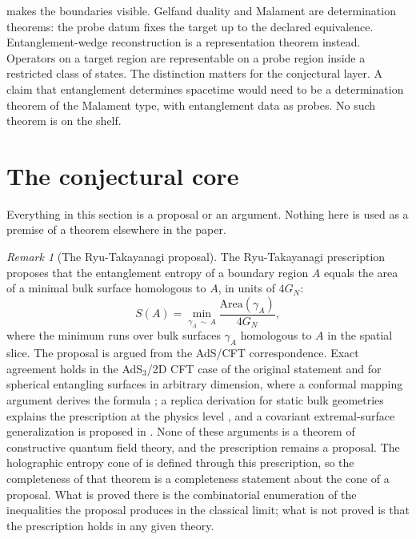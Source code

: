 \documentclass[11pt,letterpaper]{article}
\theoremstyle{definition}
\theoremstyle{remark}
\newtheorem{remark}[theorem]{Remark}
\begin{document}
 makes the boundaries visible. Gelfand duality and Malament are determination theorems: the probe datum fixes the target up to the declared equivalence. Entanglement-wedge reconstruction is a representation theorem instead. Operators on a target region are representable on a probe region inside a restricted class of states. The distinction matters for the conjectural layer. A claim that entanglement determines spacetime would need to be a determination theorem of the Malament type, with entanglement data as probes. No such theorem is on the shelf.

\section{The conjectural core}\label{sec:conjectural}

Everything in this section is a proposal or an argument. Nothing here is used as a premise of a theorem elsewhere in the paper.

\begin{remark}[The Ryu-Takayanagi proposal]\label{rem:rt}
The Ryu-Takayanagi prescription \cite{ryutakayanagi} proposes that the entanglement entropy of a boundary region $A$ equals the area of a minimal bulk surface homologous to $A$, in units of $4G_N$:
\begin{equation}\label{eq:rt}
S(A) = \min_{\gamma_A \, \sim \, A} \frac{\mathrm{Area}(\gamma_A)}{4 G_N},
\end{equation}
where the minimum runs over bulk surfaces $\gamma_A$ homologous to $A$ in the spatial slice. The proposal is argued from the AdS/CFT correspondence. Exact agreement holds in the AdS$_3$/2D CFT case of the original statement \cite{ryutakayanagi} and for spherical entangling surfaces in arbitrary dimension, where a conformal mapping argument derives the formula \cite{casinimyers}; a replica derivation for static bulk geometries explains the prescription at the physics level \cite{lewkowyczmaldacena}, and a covariant extremal-surface generalization is proposed in \cite{hrt}. None of these arguments is a theorem of constructive quantum field theory, and the prescription remains a proposal. The holographic entropy cone of  is defined through this prescription, so the completeness of that theorem is a completeness statement about the cone of a proposal. What is proved there is the combinatorial enumeration of the inequalities the proposal produces in the classical limit; what is not proved is that the prescription holds in any given theory.
\end{remark}
\end{document}

